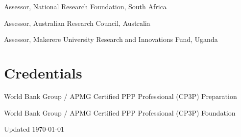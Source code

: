 \documentclass[11pt,a4paper]{report} %
\begin{document}
    \begin{tablist}

        \item[2026--] \tab{}Assessor, National Research Foundation, South Africa
        
        \item[2020--] \tab{}Assessor, Australian Research Council, Australia

        \item[2020--] \tab{}Assessor, Makerere University Research and Innovations Fund, Uganda

    \end{tablist}



    \section*{Credentials}

    \begin{tablist}

        \item[2018] \tab{}World Bank Group / APMG Certified PPP Professional (CP3P) Preparation

        \item[2017] \tab{}World Bank Group / APMG Certified PPP Professional (CP3P) Foundation

    \end{tablist}



    \begin{center}
        \vfill
        Updated \monthyeardate\today
    \end{center}
\end{document}
